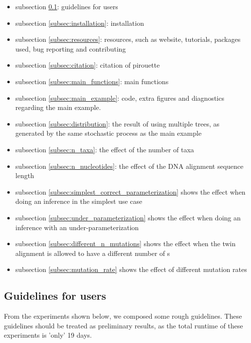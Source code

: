 \begin{itemize}
  \item{
    subsection \ref{subsec:guidelines}: guidelines for users
  }
  \item{
    subsection \ref{subsec:installation}: installation
  }
  \item{
    subsection \ref{subsec:resources}: resources, such as 
    website, tutorials, packages used, bug reporting and contributing
  }
  \item{
    subsection \ref{subsec:citation}: citation of pirouette
  }
  \item{
    subsection \ref{subsec:main_functions}: main functions
  }
  \item{
    subsection \ref{subsec:main_example}: code, extra figures and
    diagnostics regarding the main example.
  }
  \item{
    subsection \ref{subsec:distribution}: the result of using 
    multiple trees, as generated by the
    same stochastic process as the main example
  }
  \item{
    subsection \ref{subsec:n_taxa}: the effect of the number
    of taxa
  }
  \item{
    subsection \ref{subsec:n_nucleotides}: the effect of the DNA
    alignment sequence length
  }
  \item{
    subsection \ref{subsec:simplest_correct_parameterization} shows the
    effect when doing an inference in the simplest use case
  }
  \item{
    subsection \ref{subsec:under_parameterization} shows the
    effect when doing an inference with an under-parameterization
  }
  \item{
    subsection \ref{subsec:different_n_mutations} shows the
    effect when the twin alignment is allowed to have a different
    number of s
  }
  \item{
    subsection \ref{subsec:mutation_rate} shows the
    effect of different mutation rates
  }
\end{itemize}

\subsection{Guidelines for users}
\label{subsec:guidelines}

From the experiments shown below, we composed some rough guidelines.
These guidelines should be treated as preliminary results, as
the total runtime of these experiments is 'only' 19 days.

